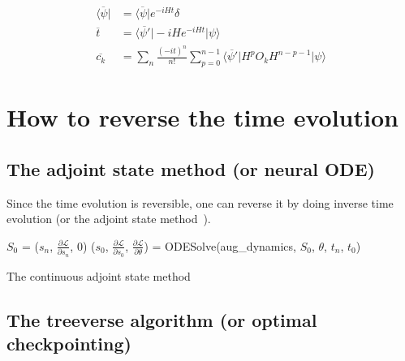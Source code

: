 \documentclass{article}
\theoremstyle{definition}
\begin{document}
\begin{align}
    \overline{\langle\psi|} &= \overline{\langle\psi|}e^{-iHt}\delta\\
    \overline{t} &= \overline{\langle\psi'|}-iHe^{-iHt}|\psi\rangle\\
    \overline{c_k} &= \sum_n \frac{(-it)^n}{n!}\sum_{p=0}^{n-1} \overline{\langle\psi'|}H^p O_k H^{n-p-1}|\psi\rangle
\end{align}

\section{How to reverse the time evolution}
\subsection{The adjoint state method (or neural ODE)}
Since the time evolution is reversible, one can reverse it by doing inverse time evolution (or the adjoint state method~\cite{Plessix2006,Chen2018}).

\begin{algorithm}
    \SetAlgoLined
    \DontPrintSemicolon
        $S_0$ = ($s_n$, $\frac{\partial \mathcal{L}}{\partial s_n}$, $0$) 
        ($s_0$, $\frac{\partial \mathcal{L}}{\partial s_0}$, $\frac{\partial \mathcal{L}}{\partial \theta}$) = ODESolve(aug\_dynamics, $S_0$, $\theta$, $t_n$, $t_0$) 
    \caption{The continuous adjoint state method}\label{alg:adjointstate}
\end{algorithm}


\subsection{The treeverse algorithm (or optimal checkpointing)}
\end{document}
